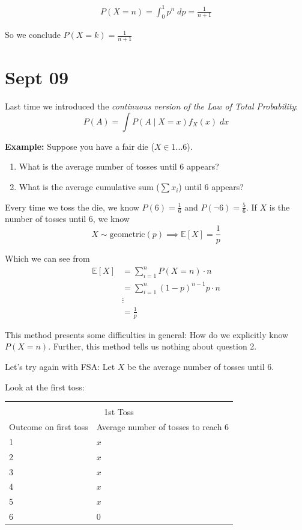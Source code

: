 \documentclass[12pt]{report}
\newcommand{\E}{\mathbb{E}}
\begin{document}
    \begin{align*}
        P(X = n) = \int_0^1 p^n \; dp = \frac{1}{n + 1}
    \end{align*}

    So we conclude $P(X = k) = \frac{1}{n + 1}$

\section{Sept 09}
    Last time we introduced the \emph{continuous version of the Law of Total Probability}:
    \[P(A) = \int P(A \; | \; X = x) f_X(x)\; dx\]

    \textbf{Example:} Suppose you have a fair die ($X \in 1...6$). 
    \begin{enumerate}
        \item What is the average number of tosses until 6 appears?
        \item What is the average cumulative sum ($\sum x_i$) until 6 appears?
    \end{enumerate}

    Every time we toss the die, we know $P(6) = \frac{1}{6}$ and $P(\lnot 6) = \frac{5}{6}$. If $X$ is the number of tosses until 6, we know 
    \[X \sim \text{geometric}(p) \implies \E[X] = \frac{1}{p}\]

    Which we can see from 
    \begin{align*}
        \E[X] &= \sum_{i=1}^n P(X = n) \cdot n\\ 
        &= \sum_{i=1}^n (1- p)^{n-1} p \cdot n\\ 
        &\vdots\\ 
        &= \frac{1}{p}
    \end{align*}

    This method presents some difficulties in general: How do we explicitly know $P(X = n)$. Further, this method tells us nothing about question 2. 

    Let's try again with FSA: Let $X$ be the average number of tosses until 6. 

    Look at the first toss:

    \begin{center}
        \begin{tabular}{|p{1in}p{1in}|}
            \hline\\
            \multicolumn{2}{c}{1st Toss}\\ 
            Outcome on first toss & Average number of tosses to reach 6\\ 
            \hline
            1 & $x$\\ 
            2 & $x$\\ 
            3 & $x$\\ 
            4 & $x$\\ 
            5 & $x$\\ 
            6 & $0$\\ 
            \hline
        \end{tabular}
    \end{center}
   
\end{document}
